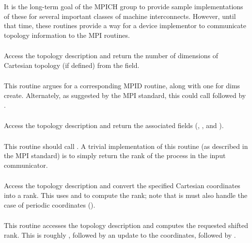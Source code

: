 \documentclass{article}
\begin{document}
It is the long-term goal of the MPICH group to provide sample implementations
of these for several important classes of machine interconnects.  However,
until that time, these routines provide a way for a device implementor to
communicate topology information to the MPI routines. 

\subsubsection{}
Access the topology description and return the number of dimensions of
Cartesian topology (if defined) from the 
field. 

\subsubsection{}
This routine argues for a corresponding MPID routine, along with one for dims
create. Alternately, as suggested by the MPI standard, this could call
 followed by .

\subsubsection{}
Access the topology description and return the associated fields
(, , and
). 

\subsubsection{}
This routine should call .  A trivial implementation
of this routine (as described in the MPI standard) is to simply return the
rank of the process in the input communicator.

\subsubsection{}
Access the topology description and convert the specified Cartesian
coordinates into a rank.  This uses  and
 to compute the rank; note that is must also
handle the case of periodic coordinates ().

\subsubsection{}
This routine accesses the topology description and computes the requested
shifted rank.  This is roughly , followed by an
update to the coordinates, followed by .  
\end{document}
